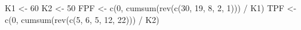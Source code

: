 \documentclass[
]{book}
\newenvironment{Shaded}{\begin{snugshade}}{\end{snugshade}}
\newcommand{\DecValTok}[1]{\textcolor[rgb]{0.00,0.00,0.81}{#1}}
\newcommand{\FunctionTok}[1]{\textcolor[rgb]{0.00,0.00,0.00}{#1}}
\newcommand{\NormalTok}[1]{#1}
\newcommand{\OtherTok}[1]{\textcolor[rgb]{0.56,0.35,0.01}{#1}}
\newcommand{\SpecialCharTok}[1]{\textcolor[rgb]{0.00,0.00,0.00}{#1}}
\begin{document}
\begin{Shaded}
\begin{Highlighting}[]
\NormalTok{K1 }\OtherTok{\textless{}{-}} \DecValTok{60}
\NormalTok{K2 }\OtherTok{\textless{}{-}} \DecValTok{50}
\NormalTok{FPF }\OtherTok{\textless{}{-}} \FunctionTok{c}\NormalTok{(}\DecValTok{0}\NormalTok{, }\FunctionTok{cumsum}\NormalTok{(}\FunctionTok{rev}\NormalTok{(}\FunctionTok{c}\NormalTok{(}\DecValTok{30}\NormalTok{, }\DecValTok{19}\NormalTok{, }\DecValTok{8}\NormalTok{, }\DecValTok{2}\NormalTok{, }\DecValTok{1}\NormalTok{))) }\SpecialCharTok{/}\NormalTok{ K1)}
\NormalTok{TPF }\OtherTok{\textless{}{-}} \FunctionTok{c}\NormalTok{(}\DecValTok{0}\NormalTok{, }\FunctionTok{cumsum}\NormalTok{(}\FunctionTok{rev}\NormalTok{(}\FunctionTok{c}\NormalTok{(}\DecValTok{5}\NormalTok{, }\DecValTok{6}\NormalTok{, }\DecValTok{5}\NormalTok{, }\DecValTok{12}\NormalTok{, }\DecValTok{22}\NormalTok{))) }\SpecialCharTok{/}\NormalTok{ K2)}


\end{Highlighting}
\end{Shaded}
\end{document}
